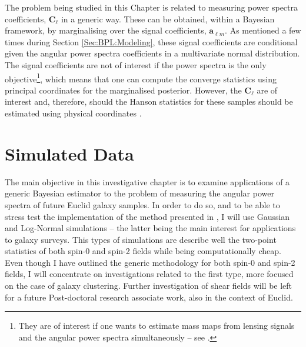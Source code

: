 \qquad The problem being studied in this Chapter is related to measuring power spectra coefficients, $\bm{C}_{\ell}$ in a generic way. These can be obtained, within a Bayesian framework, by marginalising over the signal coefficients, $\bm{a}_{\ell m}$. As mentioned a few times during Section \ref{Sec:BPL:Modeling}, these signal coefficients are conditional given the angular power spectra coefficients in a multivariate normal distribution. The signal coefficients are not of interest if the power spectra is the only objective\footnote{They are of interest if one wants to estimate mass maps from lensing signals and the angular power spectra simultaneously -- see \cite{AlmostBlackPearl2016}.}, which means that one can compute the converge statistics using principal coordinates for the marginalised posterior. However, the $\bm{C}_{\ell}$ are of interest and, therefore, should the Hanson statistics for these samples should be estimated using physical coordinates \citep{SreeThesis}. 


\section{Simulated Data}\label{Sec:BPL:SimData}
The main objective in this investigative chapter is to examine applications of a generic Bayesian estimator to the problem of measuring the angular power spectra of future Euclid galaxy samples. In order to do so, and to be able to stress test the implementation of the method presented in \cite{SreeThesis}, I will use Gaussian and Log-Normal simulations -- the latter being the main interest for applications to galaxy surveys. This types of simulations are describe well the two-point statistics of both spin-0 and spin-2 fields while being computationally cheap. Even though I have outlined the generic methodology for both spin-0 and spin-2 fields, I will concentrate on investigations related to the first type, more focused on the case of galaxy clustering. Further investigation of shear fields will be left for a future Post-doctoral research associate work, also in the context of Euclid.

